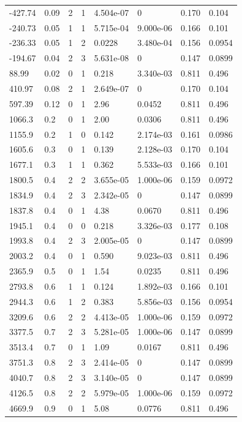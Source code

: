 \documentclass[preview]{standalone}
\begin{document}
{{\begin{tabular}{L{1.2cm}C{1.2cm} C{0.3cm}C{0.5cm} C{1.4cm}C{1.4cm} C{1.4cm}C{1.4cm}}
  -427.74  &  0.09  & 2     &  1 &  4.504e-07  & 0  & 0.170 &  0.104   \\ 
  -240.73  &  0.05  & 1     &  1 &  5.715e-04  & 9.000e-06  & 0.166 &  0.101   \\ 
  -236.33  &  0.05  & 1     &  2 &  0.0228  & 3.480e-04  & 0.156 &  0.0954   \\ 
  -194.67  &  0.04  & 2     &  3 &  5.631e-08  & 0  & 0.147 &  0.0899   \\ 
  88.99  &  0.02  & 0     &  1 &  0.218  & 3.340e-03  & 0.811 &  0.496   \\ 
  410.97  &  0.08  & 2     &  1 &  2.649e-07  & 0  & 0.170 &  0.104   \\ 
  597.39  &  0.12  & 0     &  1 &  2.96  & 0.0452  & 0.811 &  0.496   \\ 
  1066.3  &   0.2  & 0     &  1 &  2.00  & 0.0306  & 0.811 &  0.496   \\ 
  1155.9  &   0.2  & 1     &  0 &  0.142  & 2.174e-03  & 0.161 &  0.0986   \\ 
  1605.6  &   0.3  & 0     &  1 &  0.139  & 2.128e-03  & 0.170 &  0.104   \\ 
  1677.1  &   0.3  & 1     &  1 &  0.362  & 5.533e-03  & 0.166 &  0.101   \\ 
  1800.5  &   0.4  & 2     &  2 &  3.655e-05  & 1.000e-06  & 0.159 &  0.0972   \\ 
  1834.9  &   0.4  & 2     &  3 &  2.342e-05  & 0  & 0.147 &  0.0899   \\ 
  1837.8  &   0.4  & 0     &  1 &  4.38  & 0.0670  & 0.811 &  0.496   \\ 
  1945.1  &   0.4  & 0     &  0 &  0.218  & 3.326e-03  & 0.177 &  0.108   \\ 
  1993.8  &   0.4  & 2     &  3 &  2.005e-05  & 0  & 0.147 &  0.0899   \\ 
  2003.2  &   0.4  & 0     &  1 &  0.590  & 9.023e-03  & 0.811 &  0.496   \\ 
  2365.9  &   0.5  & 0     &  1 &  1.54  & 0.0235  & 0.811 &  0.496   \\ 
  2793.8  &   0.6  & 1     &  1 &  0.124  & 1.892e-03  & 0.166 &  0.101   \\ 
  2944.3  &   0.6  & 1     &  2 &  0.383  & 5.856e-03  & 0.156 &  0.0954   \\ 
  3209.6  &   0.6  & 2     &  2 &  4.413e-05  & 1.000e-06  & 0.159 &  0.0972   \\ 
  3377.5  &   0.7  & 2     &  3 &  5.281e-05  & 1.000e-06  & 0.147 &  0.0899   \\ 
  3513.4  &   0.7  & 0     &  1 &  1.09  & 0.0167  & 0.811 &  0.496   \\ 
  3751.3  &   0.8  & 2     &  3 &  2.414e-05  & 0  & 0.147 &  0.0899   \\ 
  4040.7  &   0.8  & 2     &  3 &  3.140e-05  & 0  & 0.147 &  0.0899   \\ 
  4126.5  &   0.8  & 2     &  2 &  5.979e-05  & 1.000e-06  & 0.159 &  0.0972   \\ 
  4669.9  &   0.9  & 0     &  1 &  5.08  & 0.0776  & 0.811 &  0.496   \\ 
\hline 
\end{tabular} 

}}
\end{document}
